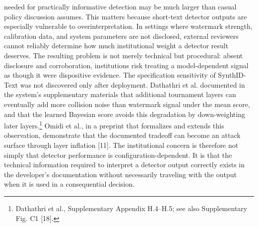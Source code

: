 \documentclass[11pt]{article}
\begin{document}
needed for practically informative detection may be much larger than casual policy
discussion assumes.
This matters because short-text detector outputs are especially vulnerable to
overinterpretation. In settings where watermark strength, calibration data, and
system parameters are not disclosed, external reviewers cannot reliably determine
how much institutional weight a detector result deserves. The resulting problem is
not merely technical but procedural: absent disclosure and corroboration,
institutions risk treating a model-dependent signal as though it were dispositive
evidence.
The specification sensitivity of SynthID-Text was not discovered only after
deployment. Dathathri et al. documented in the system's supplementary materials
that additional tournament layers can eventually add more collision noise than
watermark signal under the mean score, and that the learned Bayesian score avoids
this degradation by down-weighting later layers.\footnote{Dathathri et al.,
Supplementary Appendix H.4--H.5; see also Supplementary Fig. C1 [18].} Omidi et
al., in a preprint that formalizes and extends this observation, demonstrate that
the documented tradeoff can become an attack surface through layer inflation
[11]. The institutional concern is therefore not simply that detector performance
is configuration-dependent. It is that the technical information required to
interpret a detector output correctly exists in the developer's documentation
without necessarily traveling with the output when it is used in a consequential
decision.
\end{document}

